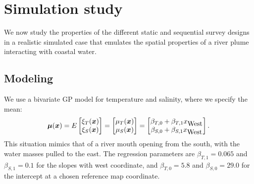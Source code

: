 \documentclass[aoas]{imsart}
\begin{document}
\section{Simulation study}
\label{sec:simulations}

We now study the properties of
the different static and sequential survey designs in a realistic
simulated case that emulates the spatial properties of a river plume interacting with coastal water.

\subsection{Modeling}

We use a bivariate GP model for temperature and salinity, where we
specify the mean:
\begin{equation}\label{m}
    \bmu(\bx)=E 
    \begin{bmatrix}
    \xi_T(\bx) \\
    \xi_S(\bx) 
    \end{bmatrix}=\begin{bmatrix} \mu_{T}(\bx)\\
\mu_{S}(\bx)
\end{bmatrix} 
= \begin{bmatrix} \beta_{T,0} + \beta_{T,1} x_{\mbox{West}} \\
\beta_{S,0} + \beta_{S,1} x_{\mbox{West}}
\end{bmatrix}.
\end{equation}
This situation
mimics that of a river mouth opening from the south, with the water
masses pulled to the east. The regression parameters are  $\beta_{T,1}=0.065$ and
$\beta_{S,1}=0.1$ for the slopes with west coordinate, and $\beta_{T,0}=5.8$
and $\beta_{S,0}=29.0$ for the intercept at a chosen reference map coordinate.

\end{document}
